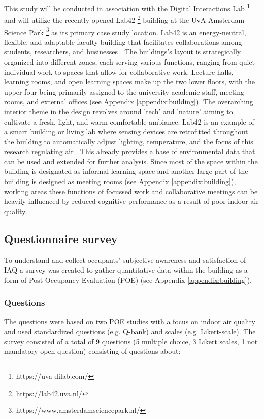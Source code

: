 This study will be conducted in association with the Digital Interactions Lab \footnote{https://uva-dilab.com/} and will utilize the recently opened Lab42 \footnote{https://lab42.uva.nl/} building at the UvA Amsterdam Science Park \footnote{https://www.amsterdamsciencepark.nl/} as its primary case study location. Lab42 is an energy-neutral, flexible, and adaptable faculty building that facilitates collaborations among students, researchers, and businesses \cite{benthem_2022}. The buildings's layout is strategically organized into different zones, each serving various functions, ranging from quiet individual work to spaces that allow for collaborative work. Lecture halls, learning rooms, and open learning spaces make up the two lower floors, with the upper four being primarily assigned to the university academic staff, meeting rooms, and external offices (see Appendix \ref{appendix:building}). The overarching interior theme in the design revolves around 'tech' and 'nature' aiming to cultivate a fresh, light, and warm comfortable ambiance. Lab42 is an example of a smart building or living lab where sensing devices are retrofitted throughout the building to automatically adjust lighting, temperature, and the focus of this research regulating air \cite{architects_lab42_2022}. This already provides a base of environmental data that can be used and extended for further analysis. Since most of the space within the building is designated as informal learning space and another large part of the building is designed as meeting rooms (see Appendix \ref{appendix:building}), working areas these functions of focussed work and collaborative meetings can be heavily influenced by reduced cognitive performance as a result of poor indoor air quality.

\subsection{Questionnaire survey}
\label{sec:questionnaire}

To understand and collect occupants' subjective awareness and satisfaction of IAQ  a survey was created to gather quantitative data within the building as a form of Post Occupancy Evaluation (POE) (see Appendix \ref{appendix:building}). 


\subsubsection{Questions}
The questions were based on two POE studies with a focus on indoor air quality \cite{silva_post-occupancy_2017, son_perceived_2023} and used standardized questions (e.g. Q-bank) and scales (e.g. Likert-scale). The survey consisted of a total of 9 questions (5 multiple choice, 3 Likert scales, 1 not mandatory open question) consisting of questions about:


